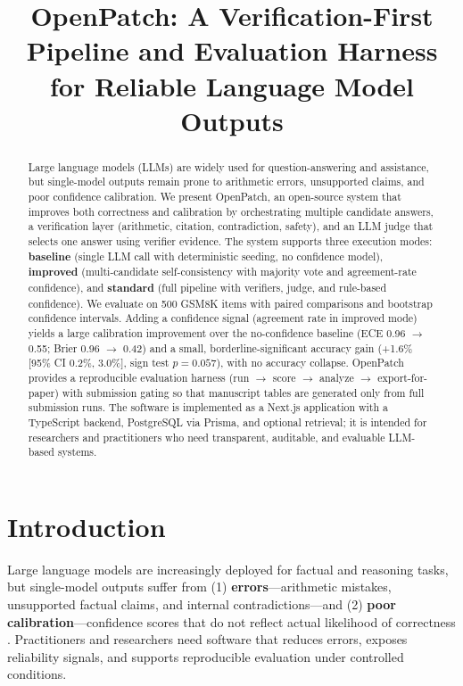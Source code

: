\documentclass[10pt]{article}
\title{OpenPatch: A Verification-First Pipeline and Evaluation Harness for Reliable Language Model Outputs}
\author{}
\begin{document}
\maketitle

\begin{abstract}
Large language models (LLMs) are widely used for question-answering and assistance, but single-model outputs remain prone to arithmetic errors, unsupported claims, and poor confidence calibration. We present OpenPatch, an open-source system that improves both correctness and calibration by orchestrating multiple candidate answers, a verification layer (arithmetic, citation, contradiction, safety), and an LLM judge that selects one answer using verifier evidence. The system supports three execution modes: \textbf{baseline} (single LLM call with deterministic seeding, no confidence model), \textbf{improved} (multi-candidate self-consistency with majority vote and agreement-rate confidence), and \textbf{standard} (full pipeline with verifiers, judge, and rule-based confidence). We evaluate on 500 GSM8K items with paired comparisons and bootstrap confidence intervals. Adding a confidence signal (agreement rate in improved mode) yields a large calibration improvement over the no-confidence baseline (ECE 0.96 $\to$ 0.55; Brier 0.96 $\to$ 0.42) and a small, borderline-significant accuracy gain (+1.6\% [95\% CI 0.2\%, 3.0\%], sign test $p = 0.057$), with no accuracy collapse. OpenPatch provides a reproducible evaluation harness (run $\to$ score $\to$ analyze $\to$ export-for-paper) with submission gating so that manuscript tables are generated only from full submission runs. The software is implemented as a Next.js application with a TypeScript backend, PostgreSQL via Prisma, and optional retrieval; it is intended for researchers and practitioners who need transparent, auditable, and evaluable LLM-based systems.
\end{abstract}

\section{Introduction}
Large language models are increasingly deployed for factual and reasoning tasks, but single-model outputs suffer from (1) \textbf{errors}---arithmetic mistakes, unsupported factual claims, and internal contradictions---and (2) \textbf{poor calibration}---confidence scores that do not reflect actual likelihood of correctness \citep{guo2017calibration}. Practitioners and researchers need software that reduces errors, exposes reliability signals, and supports reproducible evaluation under controlled conditions.
\end{document}
